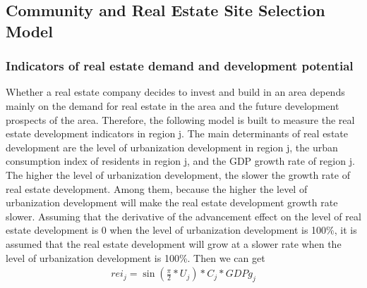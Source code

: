 \documentclass[12pt]{article}  %
\begin{document}
\subsection{Community and Real Estate Site Selection Model}
\subsubsection{Indicators of real estate demand and development potential}
Whether a real estate company decides to invest and build in an area depends mainly on the demand for real estate in the area and the future development prospects of the area. Therefore, the following model is built to measure the real estate development indicators in region j. The main determinants of real estate development are the level of urbanization development in region j, the urban consumption index of residents in region j, and the GDP growth rate of region j. The higher the level of urbanization development, the slower the growth rate of real estate development. Among them, because the higher the level of urbanization development will make the real estate development growth rate slower. Assuming that the derivative of the advancement effect on the level of real estate development is 0 when the level of urbanization development is 100\%, it is assumed that the real estate development will grow at a slower rate when the level of urbanization development is 100\%. Then we can get
\begin{align*}
    rei_{j} =  \sin (\frac{\pi}{2}*U_{j}) * C_{j}*GDPg_{j}
\end{align*}
\end{document}
